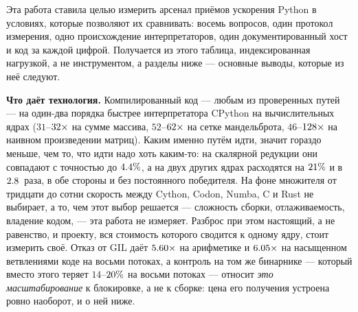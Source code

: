 Эта работа ставила целью измерить арсенал приёмов ускорения Python в условиях, которые позволяют их
сравнивать: восемь вопросов, один протокол измерения, одно происхождение интерпретаторов, один
документированный хост и код за каждой цифрой. Получается из этого таблица, индексированная
нагрузкой, а не инструментом, а разделы ниже --- основные выводы, которые из неё следуют.

\textbf{Что даёт технология.} Компилированный код --- любым из проверенных путей --- на
один-два порядка быстрее интерпретатора CPython на вычислительных ядрах ($31$--$\meas{ratio:b1_compute-314:arraysum/cpython_loop|b1_compute-314:arraysum/codon_pyext_ptr}{32}\times$ на сумме
массива, $52$--$\meas{ratio:b1_compute-314:mandelbrot/cpython_loop|b1_compute-314:mandelbrot/cython}{62}\times$ на сетке мандельброта, $46$--$\meas{ratio:b1_compute-314:matmul/cpython_loop|b1_compute-314:matmul/numba}{128}\times$ на наивном произведении матриц).
Каким именно путём идти, значит гораздо меньше, чем то, что идти надо хоть каким-то:
на скалярной редукции они совпадают с точностью до $\meas{pct:b1_compute-314:arraysum/codon_jit|b1_compute-314:arraysum/codon_pyext_ptr}{4.4}\%$, а на двух других ядрах расходятся на
$\meas{pct:b1_compute-314:mandelbrot/codon_jit|b1_compute-314:mandelbrot/cython}{21}\%$ и в $\meas{ratio:b1_compute-314:matmul/codon_jit|b1_compute-314:matmul/numba}{2.8}$~раза, в обе стороны и без постоянного победителя. На фоне множителя от тридцати до
сотни скорость между Cython, Codon, Numba, C и Rust не выбирает, а то, чем этот выбор
решается --- сложность сборки, отлаживаемость, владение кодом, --- эта работа не измеряет. Разброс при
этом настоящий, а не равенство, и проекту,
вся стоимость которого сводится к одному ядру, стоит измерить своё. Отказ от GIL даёт $\meas{ratio:b4_threads-ft:py_arith/ft/T1_control|b4_threads-ft:py_arith/ft/T8}{5.60}\times$
на арифметике и $\meas{ratio:b4_threads-ft:py_branchy/ft/T1|b4_threads-ft:py_branchy/ft/T8}{6.05}\times$ на насыщенном ветвлениями коде на восьми потоках, а контроль
 на том же бинарнике --- который вместо этого теряет $14$--$\meas{saving:b4_threads-ft_gil:py_arith/ft_gil/T1_control|b4_threads-ft_gil:py_arith/ft_gil/T8}{20}\%$ на восьми
потоках --- относит \emph{это масштабирование} к блокировке, а не к сборке: цена его
получения устроена ровно наоборот, и о ней ниже.

